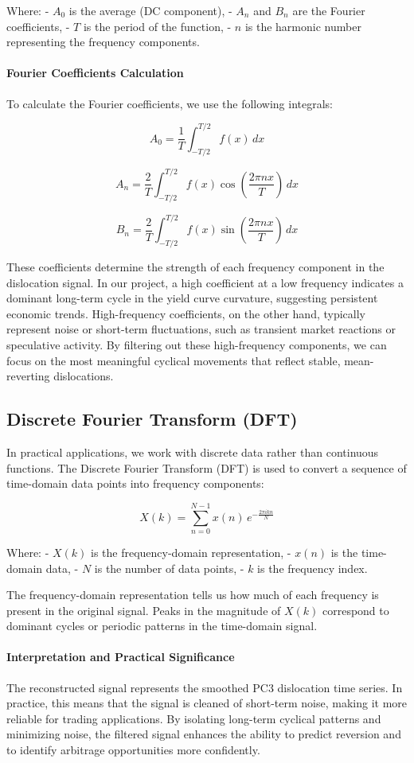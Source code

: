 \documentclass[12pt]{article}
\begin{document}
Where:
- $A_0$ is the average (DC component),
- $A_n$ and $B_n$ are the Fourier coefficients,
- $T$ is the period of the function,
- $n$ is the harmonic number representing the frequency components.

\paragraph{Fourier Coefficients Calculation}
To calculate the Fourier coefficients, we use the following integrals:

\[
A_0 = \frac{1}{T} \int_{-T/2}^{T/2} f(x) \, dx
\]

\[
A_n = \frac{2}{T} \int_{-T/2}^{T/2} f(x) \cos \left( \frac{2\pi nx}{T} \right) \, dx
\]

\[
B_n = \frac{2}{T} \int_{-T/2}^{T/2} f(x) \sin \left( \frac{2\pi nx}{T} \right) \, dx
\]

These coefficients determine the strength of each frequency component in the dislocation signal. In our project, a high coefficient at a low frequency indicates a dominant long-term cycle in the yield curve curvature, suggesting persistent economic trends. High-frequency coefficients, on the other hand, typically represent noise or short-term fluctuations, such as transient market reactions or speculative activity. By filtering out these high-frequency components, we can focus on the most meaningful cyclical movements that reflect stable, mean-reverting dislocations.

\subsection{Discrete Fourier Transform (DFT)}
In practical applications, we work with discrete data rather than continuous functions. The Discrete Fourier Transform (DFT) is used to convert a sequence of time-domain data points into frequency components:

\[
X(k) = \sum_{n=0}^{N-1} x(n) \, e^{-\frac{2\pi ikn}{N}}
\]

Where:
- $X(k)$ is the frequency-domain representation,
- $x(n)$ is the time-domain data,
- $N$ is the number of data points,
- $k$ is the frequency index.

The frequency-domain representation tells us how much of each frequency is present in the original signal. Peaks in the magnitude of $X(k)$ correspond to dominant cycles or periodic patterns in the time-domain signal.



\paragraph{Interpretation and Practical Significance}
The reconstructed signal represents the smoothed PC3 dislocation time series. In practice, this means that the signal is cleaned of short-term noise, making it more reliable for trading applications. By isolating long-term cyclical patterns and minimizing noise, the filtered signal enhances the ability to predict reversion and to identify arbitrage opportunities more confidently.
\end{document}

